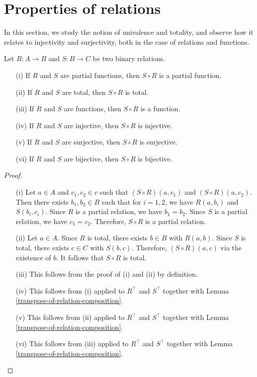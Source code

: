 \section{Properties of relations} \label{properties-of-relations}

In this section, we study the notion of univalence and totality, and observe how it relates to injectivity and surjectivity, both in the case of relations and functions.


\begin{proposition} \label{properties-of-relations-under-composition}
	Let $R : A \to B$ and $S : B \to C$ be two binary relations. 
	\begin{itemize}
		\item[(i)] If $R$ and $S$ are partial functions, then $S \circ R$ is a partial function.
		\item[(ii)] If $R$ and $S$ are total, then $S \circ R$ is total.
		\item[(iii)] If $R$ and $S$ are functions, then $S \circ R$ is a function.
		\item[(iv)] If $R$ and $S$ are injective, then $S \circ R$ is injective.
		\item[(v)] If $R$ and $S$ are surjective, then $S \circ R$ is surjective.
		\item[(vi)] If $R$ and $S$ are bijective, then $S \circ R$ is bijective.
	\end{itemize}
\end{proposition}

\begin{proof}
	\begin{itemize}
		\item[(i)] Let $a \in A$ and $c_1,c_2 \in c$ such that $(S \circ R)(a,c_1)$ and $(S \circ R)(a,c_2)$. Then there exists $b_1, b_2 \in B$ such that for $i=1,2$, we have $R(a,b_i)$ and $S(b_i, c_i)$. Since $R$ is a partial relation, we have $b_1 = b_2$. Since $S$ is a partial relation, we have $c_1 = c_2$. Therefore, $S \circ R$ is a partial relation.
		\\

		\item[(ii)] Let $a \in A$. Since $R$ is total, there exists $b \in B$ with $R(a,b)$. Since $S$ is total, there exists $c \in C$ with $S(b,c)$. Therefore, $(S \circ R)(a,c)$ via the existence of $b$. It follows that $S \circ R$ is total.

		\item[(iii)] This follows from the proof of (i) and (ii) by definition.

		\item[(iv)] This follows from (i) applied to $R^{\top}$ and $S^{\top}$ together with Lemma \autoref{transpose-of-relation-composition}.
		\item[(v)] This follows from (ii) applied to $R^{\top}$ and $S^{\top}$ together with Lemma \autoref{transpose-of-relation-composition}.
		\item[(vi)] This follows from (iii) applied to $R^{\top}$ and $S^{\top}$ together with Lemma \autoref{transpose-of-relation-composition}.
	\end{itemize}
\end{proof}

